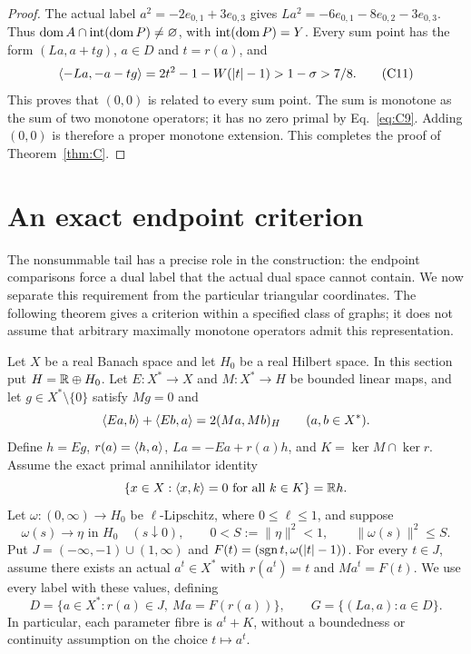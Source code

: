 \begin{proof}
The actual label $a^2=-2e_{0,1}+3e_{0,3}$ gives
$La^2=-6e_{0,1}-8e_{0,2}-3e_{0,3}$. Thus
$\operatorname{dom} A\cap\operatorname{int}(\operatorname{dom} P)\ne\varnothing$, with
$\operatorname{int}(\operatorname{dom} P)=Y$. Every sum point has the form
$(La,a+tg)$, $a\in D$ and $t=r(a)$, and
\begin{equation}
\langle -La,-a-tg\rangle=2t^2-1-W(|t|-1)>1-\sigma>7/8.
\tag{C11}\label{eq:C11}
\end{equation}
This proves that $(0,0)$ is related to every sum point. The sum is
monotone as the sum of two monotone operators; it has no zero primal by
Eq.~\eqref{eq:C9}. Adding $(0,0)$ is therefore a proper monotone extension.
This completes the proof of Theorem~\ref{thm:C}.
\end{proof}



\section{An exact endpoint criterion}
\label{sec:endpoint-criterion}
The nonsummable tail has a precise role in the construction: the endpoint
comparisons force a dual label that the actual dual space cannot contain.
We now separate this requirement from the particular triangular coordinates.
The following theorem gives a criterion within a specified class of graphs;
it does not assume that arbitrary maximally monotone operators admit this
representation.

Let $X$ be a real Banach space and let $H_0$ be a real Hilbert space.
In this section put $H=\mathbb R\oplus H_0$. Let
$E:X^*\to X$ and $M:X^*\to H$ be bounded linear maps, and let
$g\in X^*\setminus\{0\}$ satisfy $Mg=0$ and
\begin{equation}
\langle Ea,b\rangle+\langle Eb,a\rangle=2(Ma,Mb)_H
\qquad(a,b\in X^*).
\label{eq:abs-bilinear}
\end{equation}
Define $h=Eg$, $r(a)=\langle h,a\rangle$, $La=-Ea+r(a)h$, and
$K=\ker M\cap\ker r$. Assume the exact primal annihilator identity
\begin{equation}
\{x\in X:\langle x,k\rangle=0\ \hbox{for all }k\in K\}=\mathbb R h.
\label{eq:abs-annihilator}
\end{equation}
Let $\omega:(0,\infty)\to H_0$ be $\ell$-Lipschitz, where
$0\le\ell\le1$, and suppose
\begin{equation}
\omega(s)\longrightarrow\eta\text{ in }H_0\quad(s\downarrow0),
\qquad 0<S:=\|\eta\|^2<1,\qquad \|\omega(s)\|^2\le S.
\label{eq:abs-tail}
\end{equation}
Put $J=(-\infty,-1)\cup(1,\infty)$ and
$F(t)=(\operatorname{sgn} t,\omega(|t|-1))$. For every $t\in J$, assume
there exists an actual $a^t\in X^*$ with $r(a^t)=t$ and
$Ma^t=F(t)$. We use every label with these values, defining
\begin{equation}
D=\{a\in X^*:r(a)\in J,\ Ma=F(r(a))\},\qquad
G=\{(La,a):a\in D\}.
\label{eq:abs-full-graph}
\end{equation}
In particular, each parameter fibre is $a^t+K$, without a boundedness
or continuity assumption on the choice $t\mapsto a^t$.

